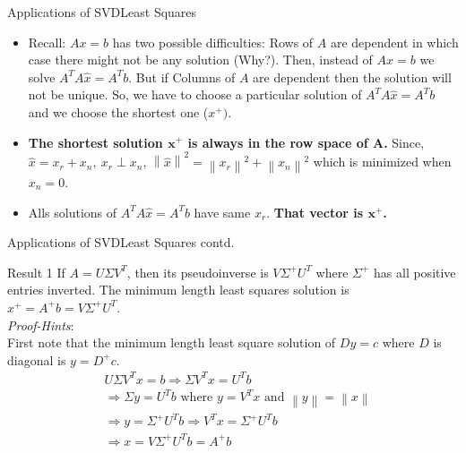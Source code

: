 \documentclass{beamer}
\begin{document}
\begin{frame}{Applications of SVD}{Least Squares}
\begin{itemize}
    \item { 
        Recall: $Ax=b$ has two possible difficulties: Rows of $A$ are dependent in which case there might not be any solution (Why?). Then, instead of $Ax=b$ we solve $A^TA\hat{x} = A^Tb$. But if Columns of $A$ are dependent then the solution will not be unique. So, we have to choose a particular solution of $A^TA\hat{x} = A^Tb$ and we choose the shortest one ($x^{+})$.
    }
    \item {
        \textbf{The shortest solution $\mathbf{x^{+}}$ is always in the row space of $\mathbf{A}$.} Since, $\hat{x} = x_r + x_n, \ x_r \perp x_n$, $\left\|\hat{x}\right\|^2 = \left\|x_r\right\|^2 + \left\|x_n\right\|^2$ which is minimized when $x_n = 0$.
    }
    \item {
        Alls solutions of $A^TA\hat{x} = A^Tb$ have same $x_r$. \textbf{That vector is $\mathbf{x^{+}}$.}
    }
\end{itemize}
\end{frame}


\begin{frame}{Applications of SVD}{Least Squares contd.}
\begin{block}{Result 1}
If $A=U\Sigma V^T$, then its pseudoinverse is $V\Sigma^{+}U^T$ where $\Sigma^{+}$ has all positive entries inverted. The minimum length least squares solution is $x^{+} = A^{+}b = V\Sigma^{+} U^T$.\\
\textit{Proof-Hints}:\\
First note that the minimum length least square solution of $Dy=c$ where $D$ is diagonal is $y = D^{+}c$.
\begin{align*}
    &U\Sigma V^T x = b \Rightarrow \Sigma V^Tx = U^T b\\
    &\Rightarrow\Sigma y = U^Tb \text{ where } y = V^T x \text{ and } \left\|y\right\| = \left\|x\right\|\\
    &\Rightarrow y = \Sigma^{+}U^Tb \Rightarrow V^Tx = \Sigma^{+}U^Tb\\ &\Rightarrow x = V\Sigma^{+}U^Tb = A^{+}b
\end{align*}
\end{block}
\end{frame}
\end{document}
